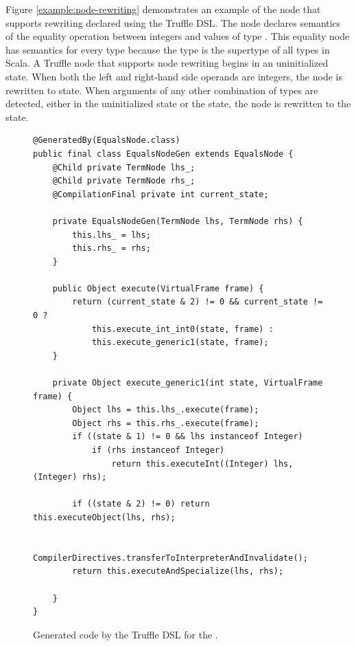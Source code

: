 Figure \ref{example:node-rewriting} demonstrates an example of the node that supports rewriting declared using the Truffle DSL.
The node declares semantics of the equality operation between integers and values of type .
This equality node has semantics for every type because the  type is the supertype of all types in Scala.
A Truffle node that supports node rewriting begins in an uninitialized state.
When both the left and right-hand side operands are integers, the node is rewritten to  state.
When arguments of any other combination of types are detected, either in the uninitialized state or the  state, the node is rewritten to the  state.


\begin{figure}[!htb]
\begin{verbatim}
@GeneratedBy(EqualsNode.class)
public final class EqualsNodeGen extends EqualsNode {
	@Child private TermNode lhs_;
	@Child private TermNode rhs_;
	@CompilationFinal private int current_state;
	
	private EqualsNodeGen(TermNode lhs, TermNode rhs) {
		this.lhs_ = lhs;
		this.rhs_ = rhs;
	}
	
	public Object execute(VirtualFrame frame) {
		return (current_state & 2) != 0 && current_state != 0 ? 
			this.execute_int_int0(state, frame) : 
			this.execute_generic1(state, frame);
	}
	
	private Object execute_generic1(int state, VirtualFrame frame) {
		Object lhs = this.lhs_.execute(frame);
		Object rhs = this.rhs_.execute(frame);
		if ((state & 1) != 0 && lhs instanceof Integer) 
			if (rhs instanceof Integer) 
				return this.executeInt((Integer) lhs, (Integer) rhs);
		
		if ((state & 2) != 0) return this.executeObject(lhs, rhs);
		
		CompilerDirectives.transferToInterpreterAndInvalidate();
		return this.executeAndSpecialize(lhs, rhs);

	}	
}
\end{verbatim}
\caption{Generated code by the Truffle DSL for the .}
\label{impl:node-rewriting-gen}
\end{figure}

